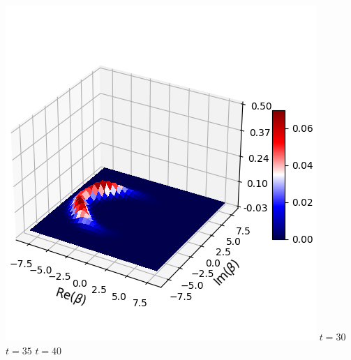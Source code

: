 \documentclass[11pt, oneside]{book}
\theoremstyle{break}
\theoremstyle{break}
\begin{document}
\begin{center}
\includegraphics[scale=0.4]{542HW6/Q(40)}
$t=30$ \qquad\qquad\qquad\qquad\qquad $t=35$ \qquad\qquad\qquad\qquad\qquad $t=40$\\
\end{center}
\end{document}

